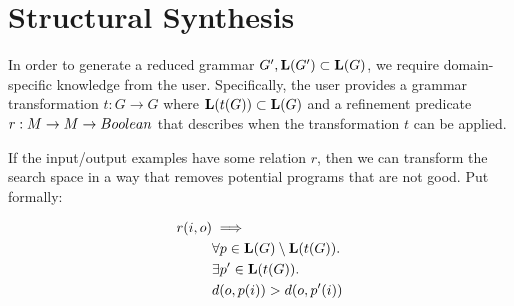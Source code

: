 \section{Structural Synthesis}
\label{sec:struct}
In order to generate a reduced grammar $G', \mathbf{L}(G') \subset \mathbf{L}(G)$, we require domain-specific knowledge from the user.
Specifically, the user provides a grammar transformation $t:G \to G$ where $\mathbf{L}(t(G)) \subset \mathbf{L}(G)$ 
  and a refinement predicate $r: M \to M \to Boolean$ that describes when the transformation $t$ can be applied. 

If the input/output examples have some relation $r$, then we can transform the search space in a way that removes potential programs that are not good.
Put formally:

\begin{align*}
   r(i,o) &\implies \\
   & \forall p \in \mathbf{L}(G) \setminus \mathbf{L}(t(G)). \\
   & \exists p' \in \mathbf{L}(t(G)). \\
   & {d}(o,p(i)) > {d}(o,p'(i)) 
\end{align*}

